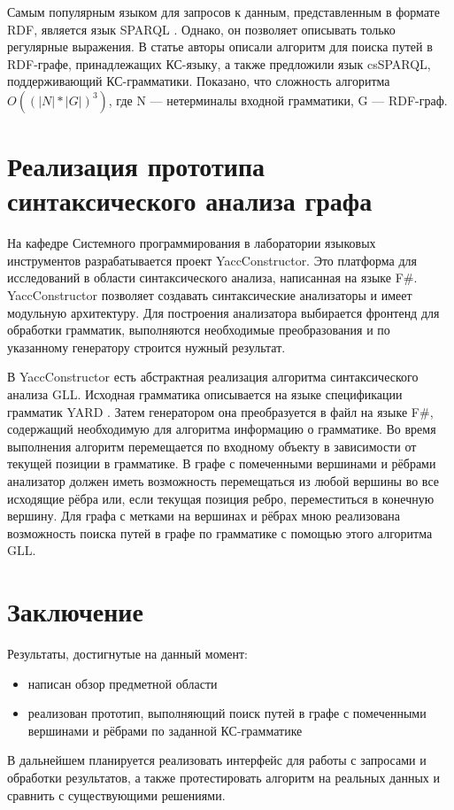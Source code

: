 \documentclass[14pt]{matmex-diploma}
\begin{document}
Самым популярным языком для запросов к данным, представленным в формате RDF, является язык SPARQL \cite{prud2008sparql}. Однако, он позволяет описывать только регулярные выражения. В статье \cite{zhang2016context} авторы описали алгоритм для поиска путей в RDF-графе, принадлежащих КС-языку, а также предложили язык  csSPARQL, поддерживающий КС-грамматики. Показано, что сложность алгоритма $O((|N|*|G|)^3)$, где N --- нетерминалы входной грамматики, G --- RDF-граф.
\section{Реализация прототипа синтаксического анализа графа}
На кафедре Системного программирования в лаборатории языковых инструментов разрабатывается проект YaccConstructor. Это платформа для исследований в области синтаксического анализа, написанная на языке F\#. YaccConstructor позволяет создавать синтаксические анализаторы и имеет модульную архитектуру. Для построения анализатора  выбирается фронтенд для обработки грамматик, выполняются необходимые преобразования и по указанному генератору строится нужный результат.

В YaccConstructor есть абстрактная реализация алгоритма синтаксического анализа GLL. Исходная грамматика описывается на языке спецификации грамматик YARD \cite{YARD}. Затем генератором она преобразуется в файл на языке F\#, содержащий необходимую для алгоритма информацию о грамматике. Во время выполнения алгоритм перемещается по входному объекту в зависимости от текущей позиции в грамматике. В графе с помеченными вершинами и рёбрами анализатор должен иметь возможность перемещаться из любой вершины во все исходящие рёбра или, если текущая позиция ребро, переместиться в конечную вершину. Для графа с метками на вершинах и рёбрах мною реализована возможность поиска путей в графе по грамматике с помощью этого алгоритма GLL.
\section{Заключение}
Результаты, достигнутые на данный момент:
\begin{itemize}
    \item написан обзор предметной области
    \item реализован прототип, выполняющий поиск путей в графе с помеченными вершинами и рёбрами по заданной КС-грамматике
\end{itemize}
В дальнейшем планируется реализовать интерфейс для работы с запросами и обработки результатов, а также протестировать алгоритм на реальных данных и сравнить с существующими решениями.
\setmonofont[Mapping=tex-text]{CMU Typewriter Text}


\end{document}
